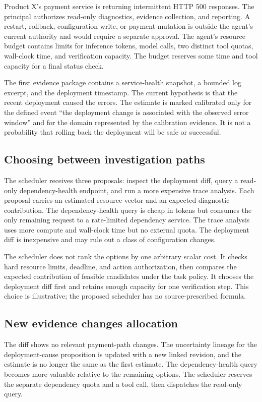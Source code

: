 Product X's payment service is returning intermittent HTTP 500 responses. The principal authorizes read-only diagnostics, evidence collection, and reporting. A restart, rollback, configuration write, or payment mutation is outside the agent's current authority and would require a separate approval. The agent's resource budget contains limits for inference tokens, model calls, two distinct tool quotas, wall-clock time, and verification capacity. The budget reserves some time and tool capacity for a final status check.

The first evidence package contains a service-health snapshot, a bounded log excerpt, and the deployment timestamp. The current hypothesis is that the recent deployment caused the errors. The estimate is marked calibrated only for the defined event ``the deployment change is associated with the observed error window'' and for the domain represented by the calibration evidence. It is not a probability that rolling back the deployment will be safe or successful.

\subsection{Choosing between investigation paths}

The scheduler receives three proposals: inspect the deployment diff, query a read-only dependency-health endpoint, and run a more expensive trace analysis. Each proposal carries an estimated resource vector and an expected diagnostic contribution. The dependency-health query is cheap in tokens but consumes the only remaining request to a rate-limited dependency service. The trace analysis uses more compute and wall-clock time but no external quota. The deployment diff is inexpensive and may rule out a class of configuration changes.

The scheduler does not rank the options by one arbitrary scalar cost. It checks hard resource limits, deadline, and action authorization, then compares the expected contribution of feasible candidates under the task policy. It chooses the deployment diff first and retains enough capacity for one verification step. This choice is illustrative; the proposed scheduler has no source-prescribed formula.

\subsection{New evidence changes allocation}

The diff shows no relevant payment-path changes. The uncertainty lineage for the deployment-cause proposition is updated with a new linked revision, and the estimate is no longer the same as the first estimate. The dependency-health query becomes more valuable relative to the remaining options. The scheduler reserves the separate dependency quota and a tool call, then dispatches the read-only query.

